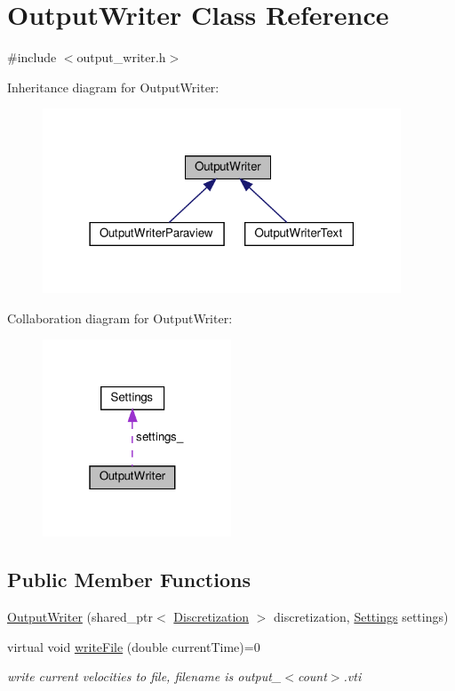 \hypertarget{classOutputWriter}{}\section{Output\+Writer Class Reference}
\label{classOutputWriter}


{\ttfamily \#include $<$output\+\_\+writer.\+h$>$}



Inheritance diagram for Output\+Writer\+:\nopagebreak
\begin{figure}[H]
\begin{center}
\leavevmode
\includegraphics[width=302pt]{classOutputWriter__inherit__graph}
\end{center}
\end{figure}


Collaboration diagram for Output\+Writer\+:\nopagebreak
\begin{figure}[H]
\begin{center}
\leavevmode
\includegraphics[width=159pt]{classOutputWriter__coll__graph}
\end{center}
\end{figure}
\subsection*{Public Member Functions}
\begin{DoxyCompactItemize}
\item 
\mbox{\hyperlink{classOutputWriter_a07a48bbf23f44147dce2ea3548f1d8e0}{Output\+Writer}} (shared\+\_\+ptr$<$ \mbox{\hyperlink{classDiscretization}{Discretization}} $>$ discretization, \mbox{\hyperlink{structSettings}{Settings}} settings)
\item 
virtual void \mbox{\hyperlink{classOutputWriter_ac625c204affdc05919388a3549c2e945}{write\+File}} (double current\+Time)=0
\begin{DoxyCompactList}\small\item\em write current velocities to file, filename is output\+\_\+$<$count$>$.\+vti \end{DoxyCompactList}\end{DoxyCompactItemize}

